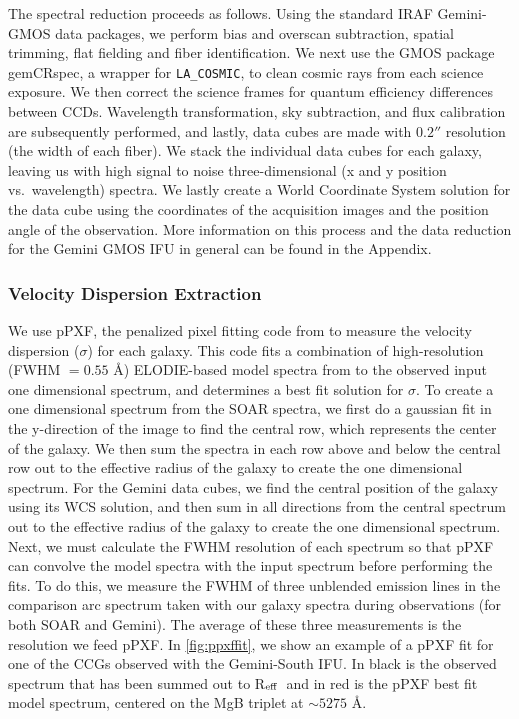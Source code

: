 \documentclass[iop,apj]{emulateapj}
\newcommand{\Reff}{R$_{\rm eff}$}
\begin{document}
The spectral reduction proceeds as follows. Using the standard IRAF Gemini-GMOS data packages, we perform bias and overscan subtraction, spatial trimming, flat fielding and fiber identification. We next use the GMOS package gemCRspec, a wrapper for \texttt{LA\_COSMIC}, to clean cosmic rays from each science exposure. We then correct the science frames for quantum efficiency differences between CCDs. Wavelength transformation, sky subtraction, and flux calibration are subsequently performed, and lastly, data cubes are made with $0.2''$ resolution (the width of each fiber). We stack the individual data cubes for each galaxy, leaving us with high signal to noise three-dimensional (x and y position vs.~wavelength) spectra. We lastly create a World Coordinate System \citep[WCS,][]{Greisen2002} solution for the data cube using the coordinates of the acquisition images and the position angle of the observation. More information on this process and the data reduction for the Gemini GMOS IFU in general can be found in the Appendix.

\subsubsection{Velocity Dispersion Extraction}

  We use {\sc pPXF}, the penalized pixel fitting code from \citet{Cappellari2004} to measure the velocity dispersion ($\sigma$) for each galaxy. This code fits a combination of high-resolution (FWHM $= 0.55$ \AA) ELODIE-based model spectra from \citet{Maraston2011} to the observed input one dimensional spectrum, and determines a best fit solution for $\sigma$. To create a one dimensional spectrum from the SOAR spectra, we first do a gaussian fit in the y-direction of the image to find the central row, which represents the center of the galaxy. We then sum the spectra in each row above and below the central row out to the effective radius of the galaxy to create the one dimensional spectrum. For the Gemini data cubes, we find the central position of the galaxy using its WCS solution, and then sum in all directions from the central spectrum out to the effective radius of the galaxy to create the one dimensional spectrum. Next, we must calculate the FWHM resolution of each spectrum so that {\sc pPXF} can convolve the model spectra with the input spectrum before performing the fits. To do this, we measure the FWHM of three unblended emission lines in the comparison arc spectrum taken with our galaxy spectra during observations (for both SOAR and Gemini). The average of these three measurements is the resolution we feed {\sc pPXF}. In \autoref{fig:ppxffit}, we show an example of a pPXF fit for one of the CCGs observed with the Gemini-South IFU. In black is the observed spectrum that has been summed out to \Reff\ and in red is the pPXF best fit model spectrum, centered on the MgB triplet at $\sim 5275$ \AA.
\end{document}

